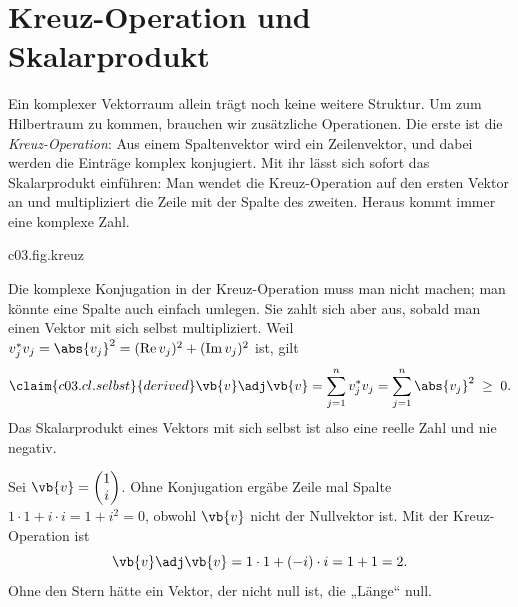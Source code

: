 \section{Kreuz-Operation und Skalarprodukt}\label{c03.s2}

Ein komplexer Vektorraum allein trägt noch keine weitere Struktur. Um zum Hilbertraum zu
kommen, brauchen wir zusätzliche Operationen. Die erste ist die \emph{Kreuz-Operation}: Aus
einem Spaltenvektor wird ein Zeilenvektor, und dabei werden die Einträge komplex
konjugiert. Mit ihr lässt sich sofort das Skalarprodukt einführen: Man wendet die
Kreuz-Operation auf den ersten Vektor an und multipliziert die Zeile mit der Spalte des
zweiten. Heraus kommt immer eine komplexe Zahl.


\begin{tpcfigure}{c03.fig.kreuz}
  \caption{Die Kreuz-Operation und das Skalarprodukt. (a) Die Einträge eines Vektors in
    $\mathbb{C}^2$ als Punkte der komplexen Ebene, hier $v_1 = 2+i$ und $v_2 = -1+2i$
    (gefüllt). Die Kreuz-Operation spiegelt jeden Eintrag an der reellen Achse (offene
    Kreise, $v_1^* = 2-i$ und $v_2^* = -1-2i$) und legt die Spalte als Zeile hin. (b) Das
    Skalarprodukt aus Beispiel~\ref{c03.ex.skalarprodukt}: Die Zeile $\vb{v}\adj$ wird
    Eintrag für Eintrag mit der Spalte $\vb{w}$ multipliziert, und die Produkte werden
    addiert.}
\end{tpcfigure}

Die komplexe Konjugation in der Kreuz-Operation muss man nicht machen; man könnte eine Spalte
auch einfach umlegen. Sie zahlt sich aber aus, sobald man einen Vektor mit sich selbst
multipliziert. Weil $v_j^* v_j = \abs{v_j}^2 = (\operatorname{Re} v_j)^2 + (\operatorname{Im} v_j)^2$
ist, gilt
\begin{equation}\label{c03.eq.selbst}\claim{c03.cl.selbst}{derived}
  \vb{v}\adj\vb{v} = \sum_{j=1}^{n} v_j^* v_j = \sum_{j=1}^{n} \abs{v_j}^2 \;\geq\; 0 .
\end{equation}
Das Skalarprodukt eines Vektors mit sich selbst ist also eine reelle Zahl und nie negativ.

\begin{example}\label{c03.ex.ohne-stern}
  Sei $\vb{v} = \begin{pmatrix} 1 \\ i \end{pmatrix}$. Ohne Konjugation ergäbe Zeile mal
  Spalte $1 \cdot 1 + i \cdot i = 1 + i^2 = 0$, obwohl $\vb{v}$ nicht der Nullvektor ist. Mit
  der Kreuz-Operation ist
  \begin{equation}\label{c03.eq.ohne-stern}
    \vb{v}\adj\vb{v} = 1 \cdot 1 + (-i) \cdot i = 1 + 1 = 2 .
  \end{equation}
  Ohne den Stern hätte ein Vektor, der nicht null ist, die „Länge“ null.
\end{example}

